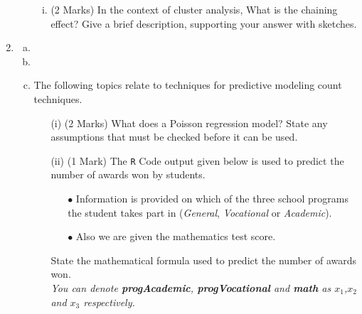 \documentclass[a4paper,12pt]{article}
\begin{document}
\begin{enumerate}
\begin{enumerate}[(a)]
\begin{enumerate}[(i)]
	\item (2 Marks) In the context of cluster analysis, What is the chaining effect? Give a brief description, supporting your answer with sketches.
	

	
\end{enumerate}


	
	\end{enumerate}
\newpage
\item 
\begin{enumerate}[(a)]
\item 



\item 

\item The following topics relate to techniques for predictive modeling count techniques.


\begin{itemize}
	\item[(i)] (2 Marks)
	What does a Poisson regression model? State any assumptions that must be checked before it can be used.
	
	\item[(ii)] (1 Mark) The \texttt{R} Code output given below is used to predict the number of awards won by students. \begin{itemize} 
		\item[$\bullet$] Information is provided on which of the three school programs the student takes part in (\textit{General}, \textit{Vocational} or \textit{Academic}). 
		\item[$\bullet$] Also we are given the mathematics test score.
	\end{itemize}
	State the mathematical formula used to predict the number of awards won.\\
	\textit{You can denote \textbf{progAcademic}, \textbf{progVocational} and \textbf{math} as $x_1$,$x_2$ and $x_3$ respectively.}
	

\end{itemize}
\end{enumerate}
\end{enumerate}
\end{document}
